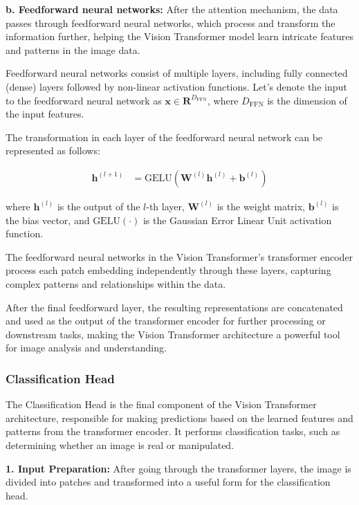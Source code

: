 \noindent \textbf{b. Feedforward neural networks:} After the attention mechanism, the data passes through feedforward neural networks, which process and transform the information further, helping the Vision Transformer model learn intricate features and patterns in the image data.

\noindent Feedforward neural networks consist of multiple layers, including fully connected (dense) layers followed by non-linear activation functions. Let's denote the input to the feedforward neural network as $\mathbf{x} \in \mathbf{R}^{D_{\text{FFN}}}$, where $D_{\text{FFN}}$ is the dimension of the input features.

\noindent The transformation in each layer of the feedforward neural network can be represented as follows:

\begin{align}
    \mathbf{h}^{(l+1)} & = \text{GELU}\left(\mathbf{W}^{(l)} \mathbf{h}^{(l)} + \mathbf{b}^{(l)}\right) \label{eq:feedforward}
\end{align}

\noindent where $\mathbf{h}^{(l)}$ is the output of the $l$-th layer, $\mathbf{W}^{(l)}$ is the weight matrix, $\mathbf{b}^{(l)}$ is the bias vector, and $\text{GELU}(\cdot)$ is the Gaussian Error Linear Unit activation function.

\noindent The feedforward neural networks in the Vision Transformer's transformer encoder process each patch embedding independently through these layers, capturing complex patterns and relationships within the data.

\noindent After the final feedforward layer, the resulting representations are concatenated and used as the output of the transformer encoder for further processing or downstream tasks, making the Vision Transformer architecture a powerful tool for image analysis and understanding.


\subsubsection{Classification Head}
The Classification Head is the final component of the Vision Transformer architecture, responsible for making predictions based on the learned features and patterns from the transformer encoder. It performs classification tasks, such as determining whether an image is real or manipulated.

\noindent \textbf{1. Input Preparation:} After going through the transformer layers, the image is divided into patches and transformed into a useful form for the classification head.

